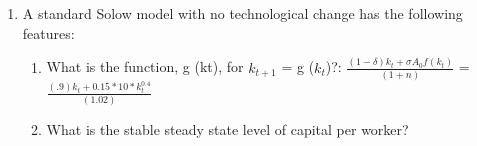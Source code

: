 \documentclass[12pt,oneside,reqno]{amsart}
\begin{document}
\begin{enumerate}
    \item A standard Solow model with no technological change has the following features:
    \begin{enumerate}
        \item What is the function, g (kt), for $k_{t+1}$ = g ($k_t$)?: $\frac{(1-\delta)k_t+\sigma A_0 f(k_t)}{(1+n)}$ = $\frac{(.9)k_t+0.15*10 *k_t^{0.4}}{(1.02)}$
        \item What is the stable steady state level of capital per worker?
    \end{enumerate}
\end{enumerate}
\end{document}
